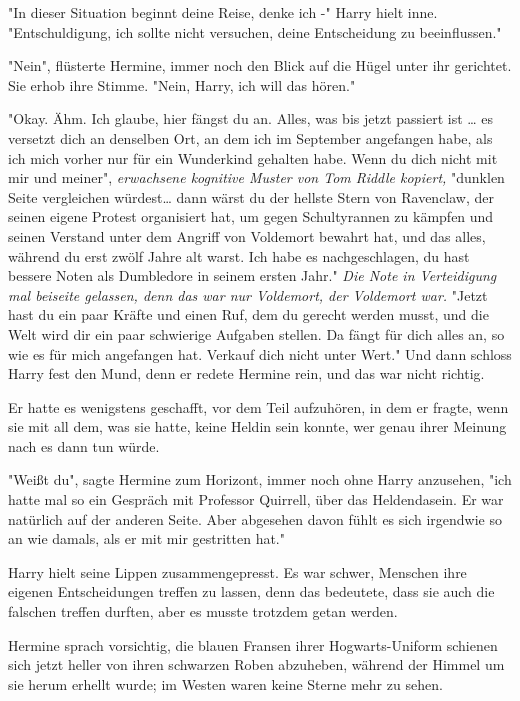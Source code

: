 {"In dieser Situation beginnt deine Reise, denke ich -" Harry hielt inne. "Entschuldigung, ich sollte nicht versuchen, deine Entscheidung zu beeinflussen."

"Nein", flüsterte Hermine, immer noch den Blick auf die Hügel unter ihr gerichtet. Sie erhob ihre Stimme. "Nein, Harry, ich will das hören."

"Okay. Ähm. Ich glaube, hier fängst du an. Alles, was bis jetzt passiert ist … es versetzt dich an denselben Ort, an dem ich im September angefangen habe, als ich mich vorher nur für ein Wunderkind gehalten habe. Wenn du dich nicht mit mir und meiner", \emph{erwachsene kognitive Muster von Tom Riddle kopiert,} "dunklen Seite vergleichen würdest… dann wärst du der hellste Stern von Ravenclaw, der seinen eigene Protest organisiert hat, um gegen Schultyrannen zu kämpfen und seinen Verstand unter dem Angriff von Voldemort bewahrt hat, und das alles, während du erst zwölf Jahre alt warst. Ich habe es nachgeschlagen, du hast bessere Noten als Dumbledore in seinem ersten Jahr." \emph{Die Note in Verteidigung mal beiseite gelassen, denn das war nur Voldemort, der Voldemort war.} "Jetzt hast du ein paar Kräfte und einen Ruf, dem du gerecht werden musst, und die Welt wird dir ein paar schwierige Aufgaben stellen. Da fängt für dich alles an, so wie es für mich angefangen hat. Verkauf dich nicht unter Wert." Und dann schloss Harry fest den Mund, denn er redete Hermine rein, und das war nicht richtig.

Er hatte es wenigstens geschafft, vor dem Teil aufzuhören, in dem er fragte, wenn sie mit all dem, was sie hatte, keine Heldin sein konnte, wer genau ihrer Meinung nach es dann tun würde.

"Weißt du", sagte Hermine zum Horizont, immer noch ohne Harry anzusehen, "ich hatte mal so ein Gespräch mit Professor Quirrell, über das Heldendasein. Er war natürlich auf der anderen Seite. Aber abgesehen davon fühlt es sich irgendwie so an wie damals, als er mit mir gestritten hat."

Harry hielt seine Lippen zusammengepresst. Es war schwer, Menschen ihre eigenen Entscheidungen treffen zu lassen, denn das bedeutete, dass sie auch die falschen treffen durften, aber es musste trotzdem getan werden.

Hermine sprach vorsichtig, die blauen Fransen ihrer Hogwarts-Uniform schienen sich jetzt heller von ihren schwarzen Roben abzuheben, während der Himmel um sie herum erhellt wurde; im Westen waren keine Sterne mehr zu sehen.

}
